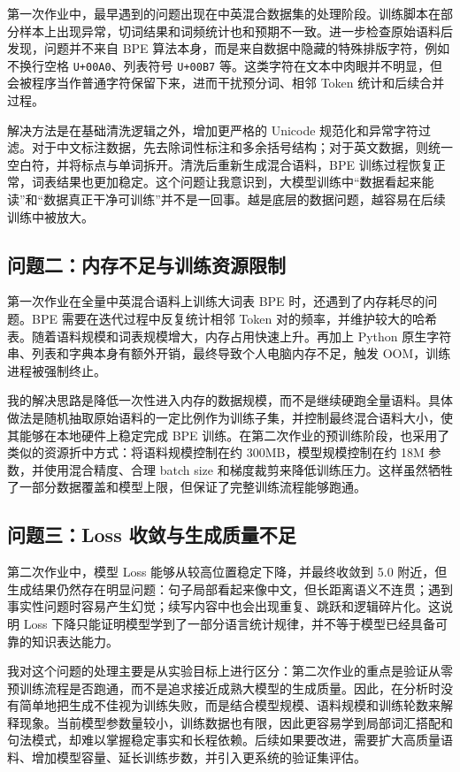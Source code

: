 \documentclass[a4paper,12pt]{ctexart}
\begin{document}
第一次作业中，最早遇到的问题出现在中英混合数据集的处理阶段。训练脚本在部分样本上出现异常，切词结果和词频统计也和预期不一致。进一步检查原始语料后发现，问题并不来自 BPE 算法本身，而是来自数据中隐藏的特殊排版字符，例如不换行空格 \texttt{U+00A0}、列表符号 \texttt{U+00B7} 等。这类字符在文本中肉眼并不明显，但会被程序当作普通字符保留下来，进而干扰预分词、相邻 Token 统计和后续合并过程。

解决方法是在基础清洗逻辑之外，增加更严格的 Unicode 规范化和异常字符过滤。对于中文标注数据，先去除词性标注和多余括号结构；对于英文数据，则统一空白符，并将标点与单词拆开。清洗后重新生成混合语料，BPE 训练过程恢复正常，词表结果也更加稳定。这个问题让我意识到，大模型训练中“数据看起来能读”和“数据真正干净可训练”并不是一回事。越是底层的数据问题，越容易在后续训练中被放大。

\subsection{问题二：内存不足与训练资源限制}

第一次作业在全量中英混合语料上训练大词表 BPE 时，还遇到了内存耗尽的问题。BPE 需要在迭代过程中反复统计相邻 Token 对的频率，并维护较大的哈希表。随着语料规模和词表规模增大，内存占用快速上升。再加上 Python 原生字符串、列表和字典本身有额外开销，最终导致个人电脑内存不足，触发 OOM，训练进程被强制终止。

我的解决思路是降低一次性进入内存的数据规模，而不是继续硬跑全量语料。具体做法是随机抽取原始语料的一定比例作为训练子集，并控制最终混合语料大小，使其能够在本地硬件上稳定完成 BPE 训练。在第二次作业的预训练阶段，也采用了类似的资源折中方式：将语料规模控制在约 300MB，模型规模控制在约 18M 参数，并使用混合精度、合理 batch size 和梯度裁剪来降低训练压力。这样虽然牺牲了一部分数据覆盖和模型上限，但保证了完整训练流程能够跑通。

\subsection{问题三：Loss 收敛与生成质量不足}

第二次作业中，模型 Loss 能够从较高位置稳定下降，并最终收敛到 5.0 附近，但生成结果仍然存在明显问题：句子局部看起来像中文，但长距离语义不连贯；遇到事实性问题时容易产生幻觉；续写内容中也会出现重复、跳跃和逻辑碎片化。这说明 Loss 下降只能证明模型学到了一部分语言统计规律，并不等于模型已经具备可靠的知识表达能力。

我对这个问题的处理主要是从实验目标上进行区分：第二次作业的重点是验证从零预训练流程是否跑通，而不是追求接近成熟大模型的生成质量。因此，在分析时没有简单地把生成不佳视为训练失败，而是结合模型规模、语料规模和训练轮数来解释现象。当前模型参数量较小，训练数据也有限，因此更容易学到局部词汇搭配和句法模式，却难以掌握稳定事实和长程依赖。后续如果要改进，需要扩大高质量语料、增加模型容量、延长训练步数，并引入更系统的验证集评估。
\end{document}
